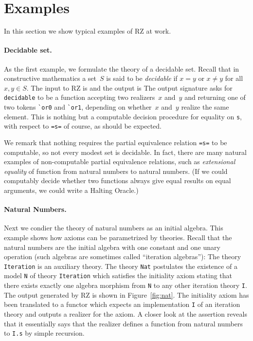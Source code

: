 \section{Examples}
\label{sec:examples}

In this section we show typical examples of RZ at work.

\paragraph{Decidable set.}
\label{sec:decidable-set}

As the first example, we formulate the theory of a decidable set.
Recall that in constructive mathematics a set~$S$ is said to be
\emph{decidable} if $x = y$ or $x \neq y$ for all $x, y \in S$.
The input to RZ is
%
{\small{}}%
%
\noindent
and the output is
%
{\small{}}
%
\noindent
The output signature asks for \Verb|decidable| to be a function
accepting two realizers~$x$ and~$y$ and returning one of two tokens
\Verb|`or0| and \Verb|`or1|, depending on whether~$x$ and~$y$ realize
the same element. This is nothing but a computable decision procedure
for equality on \Verb|s|, with respect to \Verb|=s=| of course, as
should be expected.

We remark that nothing requires the partial equivalence relation
\Verb|=s=| to be computable, so not every modest set is decidable. In
fact, there are many natural examples of non-computable partial
equivalence relations, such as \emph{extensional equality} of function
from natural numbers to natural numbers. (If we could computably
decide whether two functions always give equal results on equal
arguments, we could write a Halting Oracle.)

\paragraph{Natural Numbers.}
\label{sec:natural-numb}

Next we condier the theory of natural numbers as an initial algebra.
This example shows how axioms can be parametrized by theories. Recall
that the natural numbers are the initial algebra with one constant and
one unary operation (such algebras are sometimes called ``iteration
algebras''):
%
{\small{}}%
%
\noindent
The theory \Verb|Iteration| is an auxiliary theory. The theory
\Verb|Nat| postulates the existence of a model \Verb|N| of theory
\Verb|Iteration| which satisfies the initiality axiom stating that
there exists exactly one algebra morphism from \Verb|N| to any other
iteration theory \Verb|I|. The output generated by RZ is shown in
Figure~\ref{fig:nat}. The initiality axiom has been translated to a
functor which expects an implementation \Verb|I| of an iteration
theory and outputs a realizer for the axiom. A closer look at the
assertion reveals that it essentially says that the realizer defines a
function from natural numbers to \Verb|I.s| by simple recursion.

